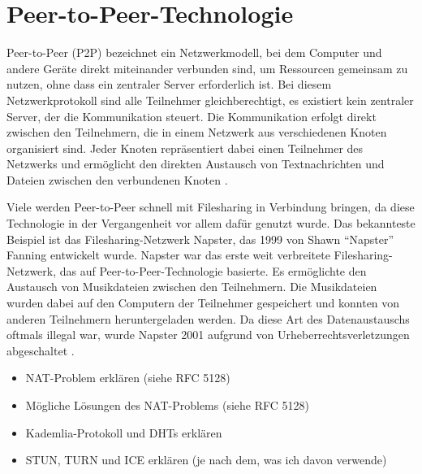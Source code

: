 \section{Peer-to-Peer-Technologie}
\label{subsec:peer_to_peer_technologie}

Peer-to-Peer (P2P) bezeichnet ein Netzwerkmodell, bei dem Computer und andere Geräte direkt miteinander verbunden sind, um Ressourcen gemeinsam zu nutzen, ohne dass ein zentraler Server erforderlich ist. Bei diesem Netzwerkprotokoll sind alle Teilnehmer gleichberechtigt, es existiert kein zentraler Server, der die Kommunikation steuert. Die Kommunikation erfolgt direkt zwischen den Teilnehmern, die in einem Netzwerk aus verschiedenen Knoten organisiert sind. Jeder Knoten repräsentiert dabei einen Teilnehmer des Netzwerks und ermöglicht den direkten Austausch von Textnachrichten und Dateien zwischen den verbundenen Knoten \parencite[S. 6-8]{Mahlmann_P2PNetzwerke}.

Viele werden Peer-to-Peer schnell mit Filesharing in Verbindung bringen, da diese Technologie in der Vergangenheit vor allem dafür genutzt wurde. Das bekannteste Beispiel ist das Filesharing-Netzwerk Napster, das 1999 von Shawn \enquote{Napster} Fanning entwickelt wurde. Napster war das erste weit verbreitete Filesharing-Netzwerk, das auf Peer-to-Peer-Technologie basierte. Es ermöglichte den Austausch von Musikdateien zwischen den Teilnehmern. Die Musikdateien wurden dabei auf den Computern der Teilnehmer gespeichert und konnten von anderen Teilnehmern heruntergeladen werden. Da diese Art des Datenaustauschs oftmals illegal war, wurde Napster 2001 aufgrund von Urheberrechtsverletzungen abgeschaltet \parencite[S. 4-6]{Mahlmann_P2PNetzwerke}.


\begin{itemize}
    \item NAT-Problem erklären (siehe RFC 5128)
    \item Mögliche Lösungen des NAT-Problems (siehe RFC 5128)
    \item Kademlia-Protokoll und DHTs erklären
    \item STUN, TURN und ICE erklären (je nach dem, was ich davon verwende)
\end{itemize}